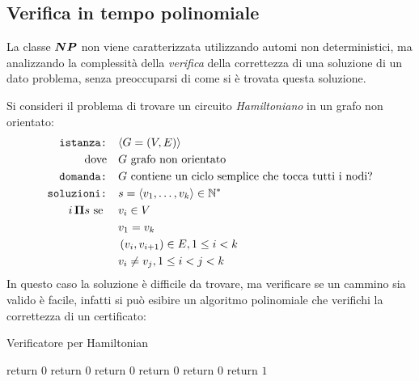 \subsection{Verifica in tempo polinomiale}

La classe $\bm{NP}{}$ non viene caratterizzata utilizzando automi non deterministici, ma analizzando la complessità della \emph{verifica} della correttezza di una soluzione di un dato problema, senza preoccuparsi di come si è trovata questa soluzione.

Si consideri il problema di trovare un circuito \emph{Hamiltoniano} in un grafo non orientato:
\begin{align*}
    \texttt{istanza:} \quad & \langle G=(V,E) \rangle \\
    \text{dove} \quad & G \text{ grafo non orientato} \\
    \texttt{domanda:} \quad & G \text{ contiene un ciclo semplice che tocca tutti i nodi?} \\
    \texttt{soluzioni:} \quad & s=\langle v_1, \dots, v_k \rangle \in \mathbb{N}^* \\
    i \, \bm{\Pi}{} s \text{ se } \quad & 
    v_i \in V \\
    & v_1 = v_k \\
    & \left( v_i, v_{i+1} \right) \in E, 1 \leq i < k \\
    & v_i \neq v_j , 1 \leq i < j < k
\end{align*}
In questo caso la soluzione è difficile da trovare, ma verificare se un cammino sia valido è facile, infatti si può esibire un algoritmo polinomiale che verifichi la correttezza di un certificato:
\begin{algorithm}[H]
\caption{Verificatore per Hamiltonian}\label{alg:verifyh}
\begin{algorithmic}[1]
            \State return $0$
        \EndIf
            \State return $0$
        \EndIf
            \State return $0$
        \EndIf
            \State return $0$
        \EndIf
                \State return $0$
            \EndIf
        \EndFor
        \State return $1$
    \EndProcedure
\end{algorithmic}
\end{algorithm}

